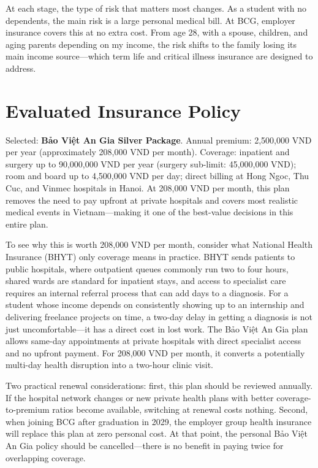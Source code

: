 At each stage, the type of risk that matters most changes. As a student with no dependents, the main risk is a large personal medical bill. At BCG, employer insurance covers this at no extra cost. From age 28, with a spouse, children, and aging parents depending on my income, the risk shifts to the family losing its main income source---which term life and critical illness insurance are designed to address.

\section{Evaluated Insurance Policy}

Selected: \textbf{Bảo Việt An Gia Silver Package}. Annual premium: 2,500,000 VND per year (approximately 208,000 VND per month). Coverage: inpatient and surgery up to 90,000,000 VND per year (surgery sub-limit: 45,000,000 VND); room and board up to 4,500,000 VND per day; direct billing at Hong Ngoc, Thu Cuc, and Vinmec hospitals in Hanoi. At 208,000 VND per month, this plan removes the need to pay upfront at private hospitals and covers most realistic medical events in Vietnam---making it one of the best-value decisions in this entire plan.

To see why this is worth 208,000 VND per month, consider what National Health Insurance (BHYT) only coverage means in practice. BHYT sends patients to public hospitals, where outpatient queues commonly run two to four hours, shared wards are standard for inpatient stays, and access to specialist care requires an internal referral process that can add days to a diagnosis. For a student whose income depends on consistently showing up to an internship and delivering freelance projects on time, a two-day delay in getting a diagnosis is not just uncomfortable---it has a direct cost in lost work. The Bảo Việt An Gia plan allows same-day appointments at private hospitals with direct specialist access and no upfront payment. For 208,000 VND per month, it converts a potentially multi-day health disruption into a two-hour clinic visit.

Two practical renewal considerations: first, this plan should be reviewed annually. If the hospital network changes or new private health plans with better coverage-to-premium ratios become available, switching at renewal costs nothing. Second, when joining BCG after graduation in 2029, the employer group health insurance will replace this plan at zero personal cost. At that point, the personal Bảo Việt An Gia policy should be cancelled---there is no benefit in paying twice for overlapping coverage.


